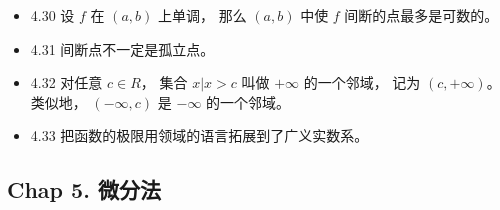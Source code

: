 \begin{itemize}
\item 4.30 设 $f$ 在 $(a,b)$ 上单调， 那么 $(a,b)$ 中使 $f$ 间断的点最多是可数的。

\item 4.31 间断点不一定是孤立点。 

\item 4.32 对任意 $c\in R$， 集合 ${x|x>c}$ 叫做 $+\infty$ 的一个邻域， 记为 $(c,+\infty)$。 类似地， $(-\infty, c)$ 是 $-\infty$ 的一个邻域。

\item 4.33 把函数的极限用领域的语言拓展到了广义实数系。
\end{itemize}

\subsection{Chap 5. 微分法}
